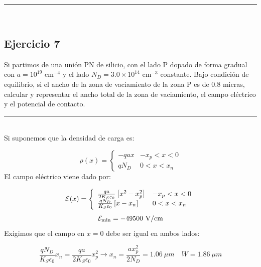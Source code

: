 \rule{\textwidth}{0.1pt} \\[2pt]




\subsection{Ejercicio 7} 

Si partimos de una unión PN de silicio, con el lado P dopado de forma gradual con 
$a = 10^{19}$ cm$^{-4}$ y el lado $N_D = 3.0 \times 10^{14}$ cm$^{-3}$ constante. 
Bajo condición de equilibrio, si el ancho de la zona de vaciamiento de la zona P es 
de 0.8 micras, calcular y representar el ancho total de la zona de vaciamiento, 
el campo eléctrico y el potencial de contacto.



\rule{\textwidth}{0.1pt} \\[2pt]

Si suponemos que la densidad de carga es:

\begin{equation*}
    \rho (x) = \left\lbrace \begin{array}{ll}
        -q a x & -x_p < x < 0  \\ 
        q N_D & 0 < x < x_n  
    \end{array} \right.
\end{equation*}
El campo eléctrico viene dado por:

\begin{equation*}
    \mathcal{E} (x) =  \left\lbrace \begin{array}{ll}
        \frac{qa}{2K_S\varepsilon_0} \left[ x^2 - x_p^2 \right] & -x_p < x < 0  \\ 
        \frac{qN_D}{K_S\varepsilon_0} \left[ x- x_n \right] & 0 < x < x_n  
    \end{array} \right. 
\end{equation*}
\begin{equation*}
    \Ecal_{\min} = -49500 \ \unit{V/cm} 
\end{equation*}
Exigimos que el campo en $x=0$ debe ser igual en ambos lados:

\begin{equation}
    \frac{qN_D}{K_S \epsilon_0} x_n = \frac{qa}{2K_S\epsilon_0} x_p^2 \rightarrow x_n = \frac{a x_p^2}{2 N_D} = 1.06 \ \unit{\mu m} \quad W = 1.86 \ \unit{\mu m}
\end{equation}


